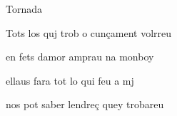 \documentclass[12pt]{article}
\begin{document}
\begin{estrofaExtra}%




\begin{tornada}

Tornada

\end{tornada}


\end{estrofaExtra}


\begin{estrofa}

 Tots los quj trob o cun\c{c}ament volrreu

 en fets damor amprau na monboy

 ellaus fara tot lo qui feu a mj

 nos pot saber lendre\c{c} quey trobareu

\end{estrofa}
\end{document}
